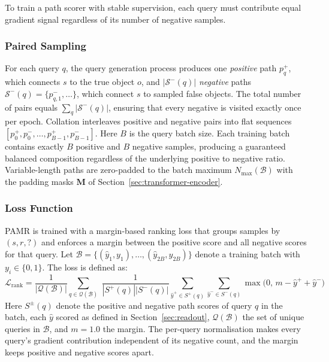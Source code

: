 \documentclass[runningheads]{llncs}
\begin{document}
\label{sec:training}

To train a path scorer with stable supervision, each query must contribute equal gradient
signal regardless of its number of negative samples.
\subsubsection{Paired Sampling}
\label{sec:paired-sampling}

For each query $q$, the query generation process produces one
\textit{positive} path $p^+_q$, which connects $s$ to the
true object $o$, and $|\mathcal{S}^-(q)|$ \textit{negative} paths
$\mathcal{S}^-(q) = \{p^-_{q,1}, \ldots\}$, which connect
$s$ to sampled false objects. The total number of pairs equals
$\sum_q |\mathcal{S}^-(q)|$, ensuring that every negative is visited exactly
once per epoch. Collation interleaves positive and negative pairs
into flat sequences
$[p^+_0, p^-_0, \ldots, p^+_{B-1}, p^-_{B-1}]$.
Here $B$ is the query batch size. Each training batch contains
exactly $B$ positive and $B$ negative samples, producing a guaranteed
balanced composition regardless of the underlying positive to negative
ratio. Variable-length paths are zero-padded to the batch maximum
$N_{\max}(\mathcal{B})$ with the padding masks $\mathbf{M}$ of
Section~\ref{sec:transformer-encoder}.

\subsubsection{Loss Function}
\label{sec:loss-functions}

PAMR is trained with a margin-based ranking loss that groups samples
by $(s, r, ?)$ and enforces a margin between the positive score
and all negative scores for that query. Let $\mathcal{B} = \{(\hat{y}_1, y_1), \ldots, (\hat{y}_{2B}, y_{2B})\}$
denote a training batch with $y_i \in \{0, 1\}$. The loss is defined as:
\begin{equation}
  \mathcal{L}_{\text{rank}} = \frac{1}{|\mathcal{Q}(\mathcal{B})|} \sum_{q \in \mathcal{Q}(\mathcal{B})}\; \frac{1}{|S^+(q)||S^-(q)|} \sum_{\hat{y}^+ \in S^+(q)} \sum_{\hat{y}^- \in S^-(q)}
  \max\bigl(0,\, m - \hat{y}^+ + \hat{y}^-\bigr)
  \label{eq:loss-rank}
\end{equation}
Here $S^{\pm}(q)$ denote the positive and negative path scores of query
$q$ in the batch, each $\hat{y}$ scored as defined in
Section~\ref{sec:readout}, $\mathcal{Q}(\mathcal{B})$ the set of unique
queries in $\mathcal{B}$, and $m = 1.0$ the margin. The per-query
normalisation makes every query's gradient contribution independent of
its negative count, and the margin keeps positive and negative scores
apart.
\end{document}

